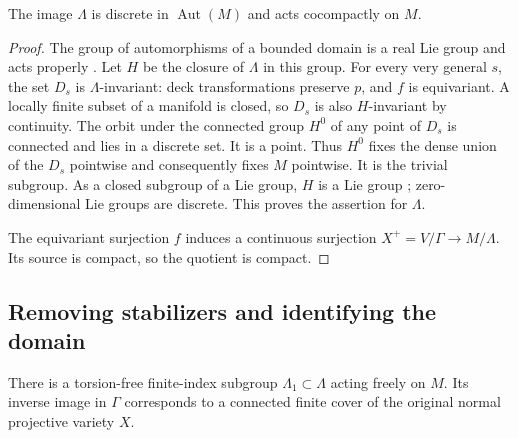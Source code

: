 \begin{proposition}\label{grp:discrete}
The image $\Lambda$ is discrete in $\operatorname{Aut}(M)$ and acts
cocompactly on $M$.
\end{proposition}

\begin{proof}
The group of automorphisms of a bounded domain is a real Lie group
\cite[Proposition~3.1 and Theorem~6.2]{Kobayashi1967} and acts properly
\cite[\S2, Propositions~2--3]{BlanchardCartan1954}.  Let $H$ be the closure of $\Lambda$ in this group.
For every very general $s$, the set $D_s$ is $\Lambda$-invariant: deck
transformations preserve $p$, and $f$ is equivariant.  A locally finite
subset of a manifold is closed, so $D_s$ is also $H$-invariant by
continuity.  The orbit under the connected group $H^0$ of any point of
$D_s$ is connected and lies in a discrete set.  It is a point.
Thus $H^0$ fixes the dense union of the $D_s$ pointwise and consequently
fixes $M$ pointwise.  It is the trivial subgroup.  As a closed subgroup
of a Lie group, $H$ is a Lie group
\cite[Chapter~II, \S III, no.~27]{CartanLie1952}; zero-dimensional Lie groups are
discrete.  This proves the assertion for $\Lambda$.

The equivariant surjection $f$ induces a continuous surjection
$X^+=V/\Gamma\to M/\Lambda$.  Its source is compact, so the quotient
is compact.
\end{proof}

\subsection{Removing stabilizers and identifying the domain}

\begin{lemma}\label{grp:free-finite-index}
There is a torsion-free finite-index subgroup $\Lambda_1\subset\Lambda$
acting freely on $M$.  Its inverse image in $\Gamma$ corresponds to a connected
finite cover of the original normal projective variety $X$.
\end{lemma}


